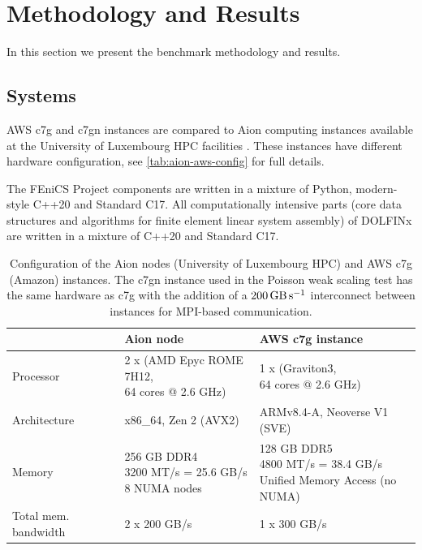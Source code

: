 \section*{Methodology and Results}
In this section we present the benchmark methodology and results. 

\subsection*{Systems}
AWS c7g and c7gn instances are compared to Aion computing instances available
at the University of Luxembourg HPC facilities \citep{VCPKVO_HPCCT22}. These
instances have different hardware configuration, see
\autoref{tab:aion-aws-config} for full details.

The FEniCS Project components are written in a mixture of Python, modern-style
C++20 and Standard C17. All computationally intensive parts (core data
structures and algorithms for finite element linear system assembly) of DOLFINx
are written in a mixture of C++20 and Standard C17.

\begin{table}
  \footnotesize
  \renewcommand{\arraystretch}{1.5}
  \begin{tabular}{l|l|l}
                              & Aion node                                                          & AWS c7g instance \\ \hline \hline
    Processor                 & \makecell[l]{2 x (AMD Epyc ROME 7H12, \\ 64 cores @ 2.6 GHz)}      & \makecell[l]{1 x (Graviton3, \\ 64 cores @ 2.6 GHz)} \\ \hline
    Architecture              & x86\_64, Zen 2 (AVX2)                                              & ARMv8.4-A, Neoverse V1 (SVE) \\ \hline
    Memory                    & \makecell[l]{256 GB DDR4 \\ 3200 MT/s = 25.6 GB/s \\ 8 NUMA nodes} & \makecell[l]{128 GB DDR5 \\ 4800 MT/s = 38.4 GB/s  \\ Unified Memory Access (no NUMA) } \\ \hline
    Total mem. bandwidth      & 2 x 200 GB/s                                                       & 1 x 300 GB/s  \\ \hline
  \end{tabular}
  \vspace{5pt}
  \caption{Configuration of the Aion nodes (University of Luxembourg HPC) and
	AWS c7g (Amazon) instances. The c7gn instance used in the Poisson weak
	scaling test has the same hardware as c7g with the addition of a
	$\SI{200}{\giga\byte\per\second}$ interconnect between instances for
	MPI-based communication.}
  \label{tab:aion-aws-config}
\end{table}

